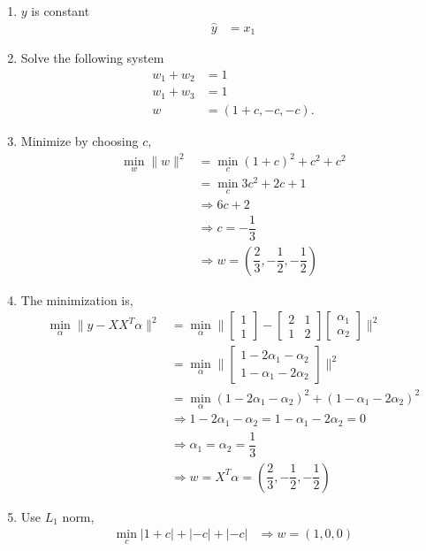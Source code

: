 \documentclass{article}
\begin{document}
\begin{enumerate}
\item $y $ is constant
\begin{align*}
\hat{y} &= x_{1}
\end{align*}
\item Solve the following system
\begin{align*}
w_{1} + w_{2} &= 1
\\ w_{1} + w_{3} &= 1
\\ w  &= \left(1 + c, -c, -c\right).
\end{align*}
\item Minimize by choosing $c, $
\begin{align*}
\displaystyle\min_{w} \| w \|^{2} &= \displaystyle\min_{c} \left(1 + c\right)^{2} + c^{2} + c^{2}
\\ &= \displaystyle\min_{c} 3 c^{2} + 2 c + 1
\\ &\Rightarrow  6 c + 2
\\ &\Rightarrow  c = - \dfrac{1}{3}
\\ &\Rightarrow  w = \left(\dfrac{2}{3}, - \dfrac{1}{2}, - \dfrac{1}{2}\right)
\end{align*}
\item The minimization is,
\begin{align*}
\displaystyle\min_{\alpha} \| y - X X^{T} \alpha \|^{2} &= \displaystyle\min_{\alpha} \| \begin{bmatrix} 1 \\ 1 \end{bmatrix} - \begin{bmatrix} 2 & 1 \\ 1 & 2 \end{bmatrix} \begin{bmatrix} \alpha_{1} \\ \alpha_{2} \end{bmatrix} \|^{2}
\\ &= \displaystyle\min_{\alpha} \| \begin{bmatrix} 1 - 2 \alpha_{1} - \alpha_{2} \\ 1 - \alpha_{1} - 2 \alpha_{2} \end{bmatrix} \|^{2}
\\ &= \displaystyle\min_{\alpha} \left(1 - 2 \alpha_{1} - \alpha_{2}\right)^{2} + \left(1 - \alpha_{1} - 2 \alpha_{2}\right)^{2}
\\ &\Rightarrow  1 - 2 \alpha_{1} - \alpha_{2} = 1 - \alpha_{1} - 2 \alpha_{2} = 0
\\ &\Rightarrow  \alpha_{1} = \alpha_{2} = \dfrac{1}{3}
\\ &\Rightarrow  w = X^{T} \alpha = \left(\dfrac{2}{3}, - \dfrac{1}{2}, - \dfrac{1}{2}\right)
\end{align*}
\item Use $L_{1}$ norm,
\begin{align*}
\displaystyle\min_{c} | 1 + c | + | -c | + | -c | &\Rightarrow  w = \left(1, 0, 0\right)
\end{align*}
\end{enumerate}
\end{document}
